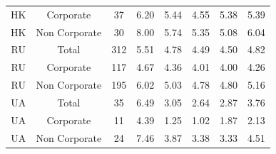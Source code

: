 {\begin{table}[ht]
{{\begin{tabular}{cccccccc}
                HK & Corporate & 37 & 6.20 & 5.44 & 4.55 & 5.38 & 5.39\\                                                                                                                                                           
                HK & Non Corporate & 30 & 8.00 & 5.74 & 5.35 & 5.08 & 6.04\\                                                                                                                                                       
                \midrule                                                                                                                                                                                                           
                RU & Total & 312 & 5.51 & 4.78 & 4.49 & 4.50 & 4.82\\                                                                                                                                                              
                RU & Corporate & 117 & 4.67 & 4.36 & 4.01 & 4.00 & 4.26\\                                                                                                                                                          
                RU & Non Corporate & 195 & 6.02 & 5.03 & 4.78 & 4.80 & 5.16\\                                                                                                                                                      
                \midrule                                                                                                                                                                                                           
                UA & Total & 35 & 6.49 & 3.05 & 2.64 & 2.87 & 3.76\\                                                                                                                                                               
                UA & Corporate & 11 & 4.39 & 1.25 & 1.02 & 1.87 & 2.13\\                                                                                                                                                           
                UA & Non Corporate & 24 & 7.46 & 3.87 & 3.38 & 3.33 & 4.51\\                                                                                                                                                       

\end{tabular}}}
\end{table}}
